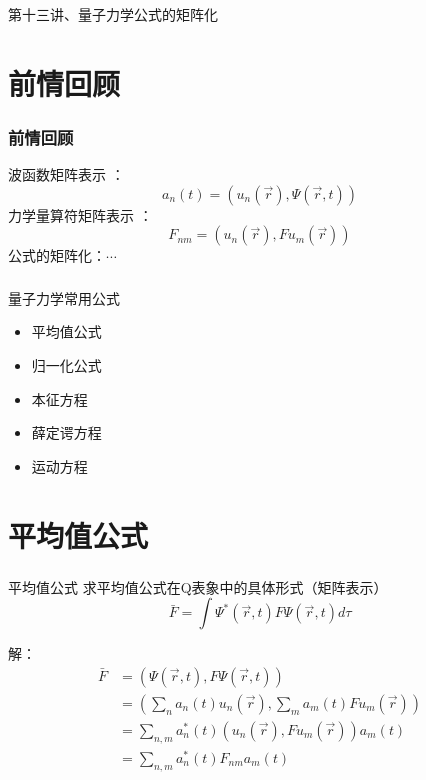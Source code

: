 \begin{frame}
    \frametitle{}
    \begin{center}
    { {\huge 第十三讲、量子力学公式的矩阵化}}
    \end{center}    
\end{frame}

\section{前情回顾}


\begin{frame}
    \frametitle{前情回顾}
    \begin{itemize}
       \done 波函数矩阵表示 ：$$ a_n(t)=(u_n(\vec{r}), \Psi(\vec{r},t)) $$ 
       \done 力学量算符矩阵表示 ： $$ F_{nm}=(u_n (\vec{r}), Fu_m(\vec{r})) $$   
       \todo 公式的矩阵化：$\cdots$
    \end{itemize}
\end{frame} 



\begin{frame} 
    \frametitle{}
    \begin{tcolorbox2}{量子力学常用公式}
        \begin{itemize}
            \item 平均值公式
            \item 归一化公式
            \item 本征方程
            \item 薛定谔方程
            \item 运动方程
        \end{itemize}   
    \end{tcolorbox2}
\end{frame} 

\section{平均值公式}

\begin{frame} 
    \frametitle{}
    \begin{tcolorbox1}{平均值公式}
        求平均值公式在Q表象中的具体形式（矩阵表示）
        $$ \bar{F}=\int \Psi^* (\vec{r},t) F \Psi(\vec{r},t) d\tau $$
    \end{tcolorbox1}
    \alert{解：} 
    \begin{equation*}
        \begin{split}
            \bar{F}&=(\Psi(\vec{r},t), F\Psi(\vec{r},t)) \\
            &= (\sum_n a_n(t) u_n(\vec{r}), \sum_m a_m(t) F u_m(\vec{r}))\\
            &= \sum_{n,m} a_n ^*(t) (u_n(\vec{r}), F u_m(\vec{r})) a_m(t)\\
            &= \sum_{n,m} a_n ^*(t) F_{nm} a_m(t)\\
        \end{split} 
    \end{equation*}
\end{frame}

